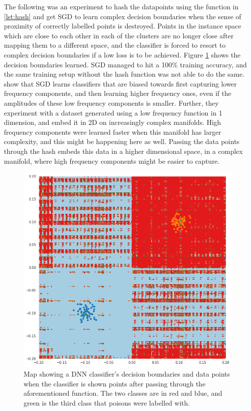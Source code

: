 \documentclass{ociamthesis}
\begin{document}
The following was an experiment to hash the datapoints using the function in
\cref{lst:hash} and get SGD to learn complex decision boundaries when the sense
of proximity of correctly labelled points is destroyed. Points in the instance
space which are close to each other in each of the clusters are no longer close
after mapping them to a different space, and the classifier is forced to resort
to complex decision boundaries if a low loss is to be achieved. Figure
\ref{fig:hash-trick} shows the decision boundaries learned. SGD managed to hit a
100\% training accuracy, and the same training setup without the hash function
was not able to do the same.
\citet{rahaman2019spectral} show that SGD learns classifiers that are biased
towards first capturing lower frequency components, and then learning higher
frequency ones, even if the amplitudes of these low frequency components is
smaller. Further, they experiment with a dataset generated using a low frequency
function in 1 dimension, and embed it in 2D on increasingly complex manifolds.
High frequency components were learned faster when this manifold has larger
complexity, and this might be happening here as well. Passing the data points
through the hash embeds this data in a higher dimensional space, in a complex
manifold, where high frequency components might be easier to capture.
\begin{figure}[!htb]
    \centering
    \includegraphics[scale=0.6]{hash_trick}
    \caption{Map showing a DNN classifier's decision boundaries and data points
    when the classifier is shown points after passing through the aforementioned
    function. The two classes are in red and blue, and green is the third class
    that poisons were labelled with.}
    \label{fig:hash-trick}
\end{figure}
\end{document}
